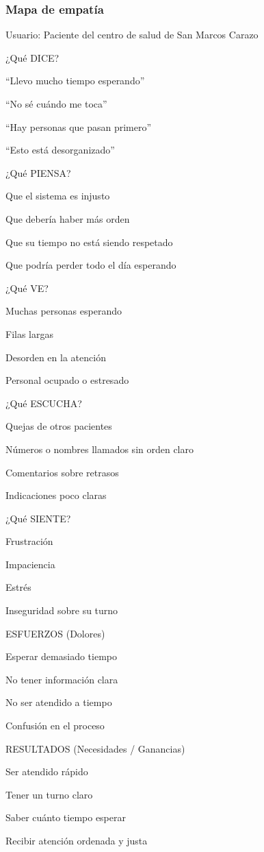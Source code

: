 \subsubsection{Mapa de empatía}

Usuario: Paciente del centro de salud de San Marcos Carazo

¿Qué DICE?

“Llevo mucho tiempo esperando”

“No sé cuándo me toca”

“Hay personas que pasan primero”

“Esto está desorganizado”

¿Qué PIENSA?

Que el sistema es injusto

Que debería haber más orden

Que su tiempo no está siendo respetado

Que podría perder todo el día esperando

¿Qué VE?

Muchas personas esperando

Filas largas

Desorden en la atención

Personal ocupado o estresado

¿Qué ESCUCHA?

Quejas de otros pacientes

Números o nombres llamados sin orden claro

Comentarios sobre retrasos

Indicaciones poco claras

¿Qué SIENTE?

Frustración

Impaciencia

Estrés

Inseguridad sobre su turno

ESFUERZOS (Dolores)

Esperar demasiado tiempo

No tener información clara

No ser atendido a tiempo

Confusión en el proceso

RESULTADOS (Necesidades / Ganancias)

Ser atendido rápido

Tener un turno claro

Saber cuánto tiempo esperar

Recibir atención ordenada y justa
